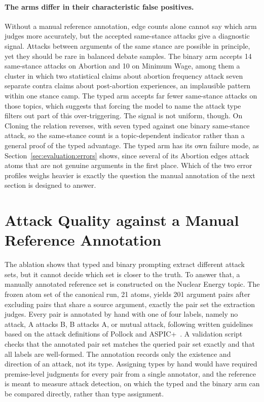 \paragraph{The arms differ in their characteristic false positives.}
Without a manual reference annotation, edge counts alone cannot say which arm judges more
accurately, but the accepted same-stance attacks give a diagnostic signal.
Attacks between arguments of the same stance are possible in principle, yet
they should be rare in balanced debate samples. The binary arm accepts 14
same-stance attacks on Abortion and 10 on Minimum Wage, among them a cluster in
which two statistical claims about abortion frequency attack seven separate
contra claims about post-abortion experiences, an implausible pattern within
one stance camp. The typed arm accepts far fewer same-stance attacks on those
topics, which suggests that forcing the model to name the attack type filters
out part of this over-triggering. The signal is not uniform, though. On
Cloning the relation reverses, with seven typed against one binary same-stance
attack, so the same-stance count is a topic-dependent indicator rather than a
general proof of the typed advantage. The typed arm has its own failure mode, as
Section~\ref{sec:evaluation:errors} shows, since several of its Abortion edges
attack atoms that are not genuine arguments in the first place. Which of the
two error profiles weighs heavier is exactly the question the manual annotation of
the next section is designed to answer.

\section{Attack Quality against a Manual Reference Annotation}
\label{sec:evaluation:gold}

The ablation shows that typed and binary prompting extract different attack
sets, but it cannot decide which set is closer to the truth. To answer that, a
manually annotated reference set is constructed on the Nuclear Energy topic. The frozen
atom set of the canonical run, 21 atoms, yields 201 argument pairs after
excluding pairs that share a source argument, exactly the pair set the
extraction judges. Every pair is annotated by hand with one of four labels,
namely no attack, A attacks B, B attacks A, or mutual attack, following written
guidelines based on the attack definitions of Pollock and
ASPIC+~\cite{pollock1992, modgil2014}. A validation script checks that the
annotated pair set matches the queried pair set exactly and that all labels are
well-formed. The annotation records only the existence and direction of an
attack, not its type. Assigning types by hand would have required
premise-level judgments for every pair from a single annotator, and the
reference is meant to measure attack detection, on which the typed and the
binary arm can be compared directly, rather than type assignment.

